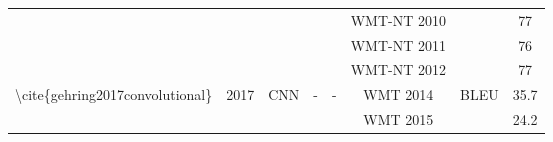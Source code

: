 \begin{table}[]
\begin{tabular}{|c|c|c|c|c|c|cc|}
                                                                                          &                                            &                                                   &                                                           &                                                                                                                        & WMT-NT 2010                                           & \multicolumn{1}{c|}{}                                                                                                              & 77                         \\ \cline{6-6} \cline{8-8} 
                                                                                          &                                            &                                                   &                                                           &                                                                                                                        & WMT-NT 2011                                           & \multicolumn{1}{c|}{}                                                                                                              & 76                         \\ \cline{6-6} \cline{8-8} 
                                                                                          &                                            &                                                   &                                                           &                                                                                                                        & WMT-NT 2012                                           & \multicolumn{1}{c|}{}                                                                                                              & 77                         \\ \hline
    \multirow{3}{*}{\textbackslash{}cite\{gehring2017convolutional\}}                     & \multirow{3}{*}{2017}                      & \multirow{3}{*}{CNN}                              & \multirow{3}{*}{-}                                        & \multirow{3}{*}{-}                                                                                                     & WMT 2014                                              & \multicolumn{1}{c|}{\multirow{3}{*}{BLEU}}                                                                                         & 35.7                       \\ \cline{6-6} \cline{8-8} 
                                                                                          &                                            &                                                   &                                                           &                                                                                                                        & WMT 2015                                              & \multicolumn{1}{c|}{}                                                                                                              & 24.2                       \\ \cline{6-6} \cline{8-8} 

\end{tabular}
\end{table}
